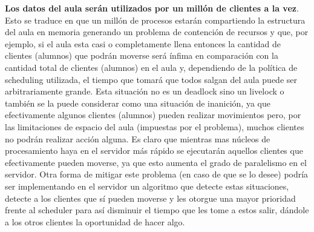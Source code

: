 \textbf{Los datos del aula serán utilizados por un millón de clientes a la vez}. Esto se traduce en que un millón de procesos estarán compartiendo la estructura del aula en memoria generando un problema de contención de recursos y que, por ejemplo, si el aula esta casi o completamente llena entonces la cantidad de clientes (alumnos) que podrán moverse será ínfima en comparación con la cantidad total de clientes (alumnos) en el aula y, dependiendo de la política de scheduling utilizada, el tiempo que tomará que todos salgan del aula puede ser arbitrariamente grande. Esta situación no es un deadlock sino un livelock o también se la puede considerar como una situación de inanición, ya que efectivamente algunos clientes (alumnos) pueden realizar movimientos pero, por las limitaciones de espacio del aula (impuestas por el problema), muchos clientes no podrán realizar acción alguna. 
Es claro que mientras mas núcleos de procesamiento haya en el servidor más rápido se ejecutarán aquellos clientes que efectivamente pueden moverse, ya que esto aumenta el grado de paralelismo en el servidor. Otra forma de mitigar este problema (en caso de que se lo desee) podría ser implementando en el servidor un algoritmo que detecte estas situaciones, detecte a los clientes que sí pueden moverse y les otorgue una mayor prioridad frente al scheduler para así disminuir el tiempo que les tome a estos salir, dándole a los otros clientes la oportunidad de hacer algo.
